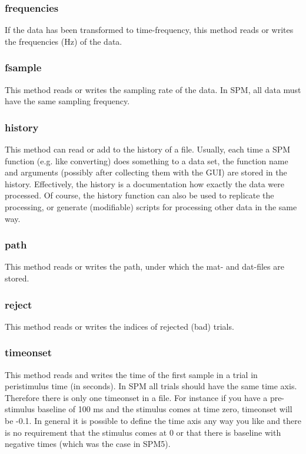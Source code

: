 \subsubsection{frequencies}
If the data has been transformed to time-frequency, this method reads
or writes the frequencies (Hz) of the data.

\subsubsection{fsample}
This method reads or writes the sampling rate of the data. In SPM, all
data must have the same sampling frequency.


\subsubsection{history}
This method can read or add to the history of a file. Usually, each
time a SPM function (e.g. like converting) does something to a data
set, the function name and arguments (possibly after collecting them
with the GUI) are stored in the history. Effectively, the history is a
documentation how exactly the data were processed. Of course, the
history function can also be used to replicate the processing, or
generate (modifiable) scripts for processing other data in the same
way.

\subsubsection{path}
This method reads or writes the path, under which the mat- and
dat-files are stored. 

\subsubsection{reject}
This method reads or writes the indices of rejected (bad) trials.

\subsubsection{timeonset}
This method reads and writes the time of the first sample in a trial
in peristimulus time (in seconds). In SPM all trials should have the
same time axis. Therefore there is only one timeonset in a file. For instance
if you have a pre-stimulus baseline of 100 ms and the stimulus comes at time zero,
timeonset will be -0.1. In general it is possible to define the time axis any way
you like and there is no requirement that the stimulus comes at 0 or that there
is baseline with negative times (which was the case in SPM5).

